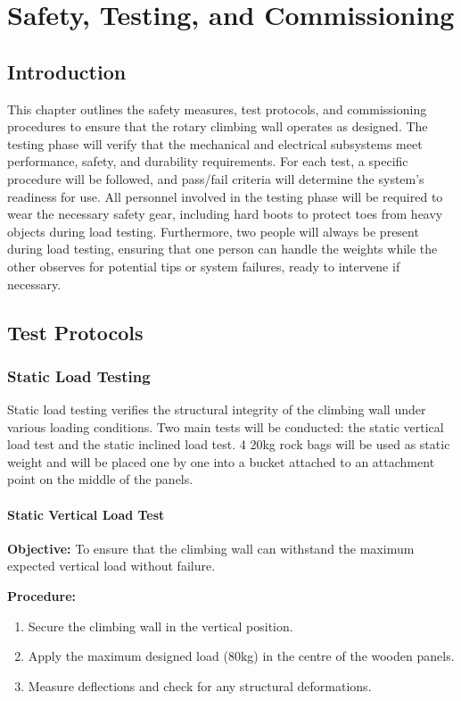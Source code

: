 \chapter{Safety, Testing, and Commissioning}
\label{chap:safety_testing_commissioning}

\section{Introduction}
This chapter outlines the safety measures, test protocols, and commissioning procedures to ensure that the rotary climbing wall operates as designed. The testing phase will verify that the mechanical and electrical subsystems meet performance, safety, and durability requirements. For each test, a specific procedure will be followed, and pass/fail criteria will determine the system's readiness for use. All personnel involved in the testing phase will be required to wear the necessary safety gear, including hard boots to protect toes from heavy objects during load testing. Furthermore, two people will always be present during load testing, ensuring that one person can handle the weights while the other observes for potential tips or system failures, ready to intervene if necessary.

\section{Test Protocols}

\subsection{Static Load Testing}
Static load testing verifies the structural integrity of the climbing wall under various loading conditions. Two main tests will be conducted: the static vertical load test and the static inclined load test. 4 20kg rock bags will be used as static weight and will be placed one by one into a bucket attached to an attachment point on the middle of the panels.

\subsubsection{Static Vertical Load Test}
\textbf{Objective:} To ensure that the climbing wall can withstand the maximum expected vertical load without failure.

\textbf{Procedure:}
\begin{enumerate}
    \item Secure the climbing wall in the vertical position.
    \item Apply the maximum designed load (80kg) in the centre of the wooden panels.
    \item Measure deflections and check for any structural deformations.
\end{enumerate}

